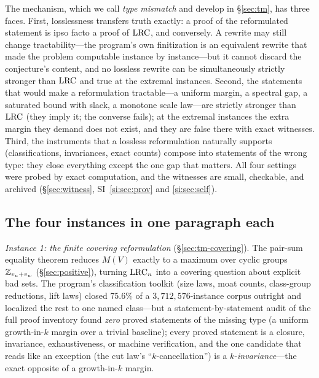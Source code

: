 The mechanism, which we call \emph{type mismatch} and develop in
\S\ref{sec:tm}, has three faces. First, losslessness transfers truth
exactly: a proof of the reformulated statement is ipso facto a proof of
$\mathrm{LRC}$, and conversely. A rewrite may still change tractability---the
program's own finitization is an equivalent rewrite that made the problem
computable instance by instance---but it cannot discard the conjecture's
content, and no lossless rewrite can be simultaneously strictly stronger
than $\mathrm{LRC}$ and true at the extremal instances. Second, the statements
that would make a reformulation tractable---a uniform margin, a spectral
gap, a saturated bound with slack, a monotone scale law---are strictly
stronger than $\mathrm{LRC}$ (they imply it; the converse fails); at the extremal
instances the extra margin they demand does not exist, and they are false
there with exact witnesses. Third, the instruments that a lossless
reformulation naturally supports (classifications, invariances, exact
counts) compose into statements of the wrong type: they close everything
except the one gap that matters. All four settings were probed by exact
computation, and the witnesses are small, checkable, and archived
(\S\ref{sec:witness}, SI~\ref{si:sec:prov} and \ref{si:sec:self}).

\subsection{The four instances in one paragraph each}

\emph{Instance 1: the finite covering reformulation}
(\S\ref{sec:tm-covering}). The pair-sum equality theorem reduces
$M(V)$ exactly to a maximum over cyclic groups $\mathbb{Z}_{v_u+v_w}$
(\S\ref{sec:positive}), turning $\mathrm{LRC}_n$ into a covering question about
explicit bad sets. The program's classification toolkit (size laws, moat
counts, class-group reductions, lift laws) closed $75.6\%$ of a
$3{,}712{,}576$-instance corpus outright and localized the rest to one
named class---but a statement-by-statement audit of the full proof
inventory found \emph{zero} proved statements of the missing type (a
uniform growth-in-$k$ margin over a trivial baseline); every proved
statement is a closure, invariance, exhaustiveness, or machine
verification, and the one candidate that reads like an exception (the cut
law's ``$k$-cancellation'') is a $k$-\emph{invariance}---the exact
opposite of a growth-in-$k$ margin.

